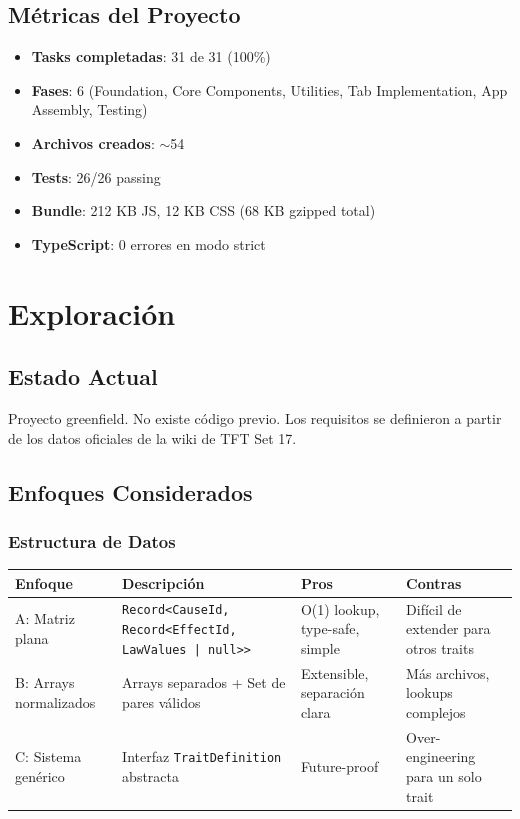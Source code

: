 \documentclass[11pt,a4paper]{report}
\begin{document}
\section{Métricas del Proyecto}

\begin{itemize}
  \item \textbf{Tasks completadas}: 31 de 31 (100\%)
  \item \textbf{Fases}: 6 (Foundation, Core Components, Utilities, Tab Implementation, App Assembly, Testing)
  \item \textbf{Archivos creados}: $\sim$54
  \item \textbf{Tests}: 26/26 passing
  \item \textbf{Bundle}: 212 KB JS, 12 KB CSS (68 KB gzipped total)
  \item \textbf{TypeScript}: 0 errores en modo strict
\end{itemize}

\cleardoublepage

\chapter{Exploración}

\section{Estado Actual}

Proyecto greenfield. No existe código previo. Los requisitos se definieron a partir de los datos oficiales de la wiki de TFT Set 17.

\section{Enfoques Considerados}

\subsection{Estructura de Datos}

\begin{table}[h]
\centering
\begin{tabularx}{\textwidth}{@{}lXll@{}}
\toprule
\textbf{Enfoque} & \textbf{Descripción} & \textbf{Pros} & \textbf{Contras} \\
\midrule
A: Matriz plana & \texttt{Record<CauseId, Record<EffectId, LawValues | null>>} & O(1) lookup, type-safe, simple & Difícil de extender para otros traits \\
B: Arrays normalizados & Arrays separados + Set de pares válidos & Extensible, separación clara & Más archivos, lookups complejos \\
C: Sistema genérico & Interfaz \texttt{TraitDefinition} abstracta & Future-proof & Over-engineering para un solo trait \\
\bottomrule
\end{tabularx}
\end{table}
\end{document}
